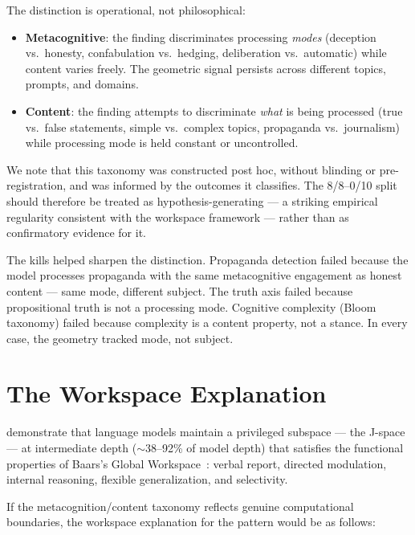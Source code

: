 \documentclass[11pt,a4paper]{article}
\begin{document}
The distinction is operational, not philosophical:

\begin{itemize}[nosep]
\item \textbf{Metacognitive}: the finding discriminates processing
  \emph{modes} (deception vs.\ honesty, confabulation vs.\ hedging,
  deliberation vs.\ automatic) while content varies freely. The
  geometric signal persists across different topics, prompts, and
  domains.
\item \textbf{Content}: the finding attempts to discriminate
  \emph{what} is being processed (true vs.\ false statements,
  simple vs.\ complex topics, propaganda vs.\ journalism) while
  processing mode is held constant or uncontrolled.
\end{itemize}

We note that this taxonomy was constructed post hoc, without blinding
or pre-registration, and was informed by the outcomes it classifies.
The 8/8--0/10 split should therefore be treated as
hypothesis-generating --- a striking empirical regularity consistent
with the workspace framework --- rather than as confirmatory evidence
for it.

The kills helped sharpen the distinction. Propaganda detection failed
because the model processes propaganda with the same metacognitive
engagement as honest content --- same mode, different subject. The
truth axis failed because propositional truth is not a processing
mode. Cognitive complexity (Bloom taxonomy) failed because complexity
is a content property, not a stance. In every case, the geometry
tracked mode, not subject.

\section{The Workspace Explanation}
\label{sec:workspace}

\citet{gurnee2026gwt} demonstrate that language models
maintain a privileged subspace --- the J-space --- at intermediate
depth ($\sim$38--92\% of model depth) that satisfies the functional
properties of Baars's Global Workspace~\citep{baars1988cognitive}:
verbal report, directed modulation, internal reasoning, flexible
generalization, and selectivity.

If the metacognition/content taxonomy reflects genuine computational
boundaries, the workspace explanation for the pattern would be as
follows:
\end{document}
